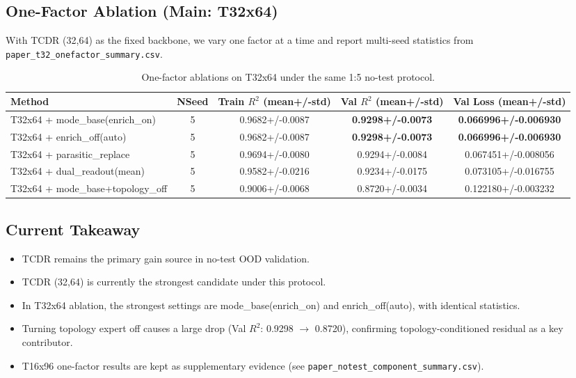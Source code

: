 \subsection{One-Factor Ablation (Main: T32x64)}
With TCDR (32,64) as the fixed backbone, we vary one factor at a time and report
multi-seed statistics from \texttt{paper\_t32\_onefactor\_summary.csv}.

\begin{table}[htbp]
\centering
\small
\setlength{\tabcolsep}{4pt}
\begin{tabular}{lcccc}
\toprule
Method & NSeed & Train $R^2$ (mean+/-std) & Val $R^2$ (mean+/-std) & Val Loss (mean+/-std) \\
\midrule
T32x64 + mode\_base(enrich\_on) & 5 & 0.9682+/-0.0087 & \textbf{0.9298+/-0.0073} & \textbf{0.066996+/-0.006930} \\
T32x64 + enrich\_off(auto) & 5 & 0.9682+/-0.0087 & \textbf{0.9298+/-0.0073} & \textbf{0.066996+/-0.006930} \\
T32x64 + parasitic\_replace & 5 & 0.9694+/-0.0080 & 0.9294+/-0.0084 & 0.067451+/-0.008056 \\
T32x64 + dual\_readout(mean) & 5 & 0.9582+/-0.0216 & 0.9234+/-0.0175 & 0.073105+/-0.016755 \\
T32x64 + mode\_base+topology\_off & 5 & 0.9006+/-0.0068 & 0.8720+/-0.0034 & 0.122180+/-0.003232 \\
\bottomrule
\end{tabular}
\caption{One-factor ablations on T32x64 under the same 1:5 no-test protocol.}
\label{tab:notest_component}
\end{table}

\subsection{Current Takeaway}
\begin{itemize}
  \item TCDR remains the primary gain source in no-test OOD validation.
  \item TCDR (32,64) is currently the strongest candidate under this protocol.
  \item In T32x64 ablation, the strongest settings are mode\_base(enrich\_on) and enrich\_off(auto), with identical statistics.
  \item Turning topology expert off causes a large drop (Val $R^2$: 0.9298 $\rightarrow$ 0.8720), confirming topology-conditioned residual as a key contributor.
  \item T16x96 one-factor results are kept as supplementary evidence (see \texttt{paper\_notest\_component\_summary.csv}).
\end{itemize}
